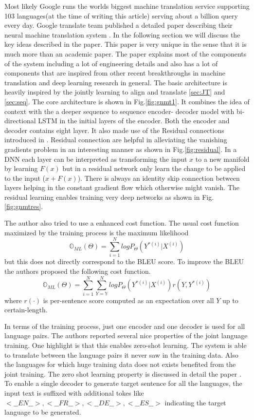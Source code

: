 \documentclass[a4paper]{article}
\begin{document}
Most  likely  Google  runs  the  worlds   biggest  machine  translation  service
supporting 103 languages(at the  time of writing  this article) serving  about a
billion  query  every  day.  Google  translate team published  a detailed  paper
describing their neural  machine translation system \cite{wu2016google}. In  the
following section we will discuss  the key  ideas  described in  the paper. This
paper  is very unique in the sense that it is much more than an  academic paper.
The paper explains most  of  the  components  of the system  including a  lot of
engineering details and  also has a  lot  of components that  are inspired  from
other recent breakthroughs in machine translation and deep  learning research in
general. The  basic architecture is heavily inspired  by the jointly learning to
align  and  translate  \ref{sec:JT} and \ref{sec:seq}. The core architecture  is
shown in Fig.\ref{fig:gnmt1}. It combines the  idea of context with the a deeper
sequence to  sequence encoder- decoder  model  with  bi-directional LSTM in  the
initial  layers  of the encoder.  Both  the  encoder and decoder contains  eight
layer.  It   also  made   use  of   the  Residual  connections   introduced   in
\cite{he2016deep}. Residual connection are helpful in alleviating the  vanishing
gradients problem in an interesting manner as  shown  in Fig.\ref{fig:residual}.
In a DNN each layer can  be  interpreted as transforming the input $x$  to a new
manifold  by learning $F(x)$ but in a  residual network only learn the change to
be  applied  to  the  input  ($x  +  F(x)$). There  is always  an  identity skip
connection between layers helping in the constant gradient flow  which otherwise
might vanish. The residual learning enables training very deep networks as shown
in Fig.\ref{fig:gnmtres}.

The author  also tried to use a  enhanced cost function. The usual cost function
maximized    by    the   training    process   is    the    maximum   likelihood
$$\mathbb{O}_{ML}(\Theta) = \sum_{i=1}^N log P_\Theta(Y^{*(i)} | X^{(i)}) $$ but
this  does  not directly  correspond  to the BLEU score. To improve the BLEU the
authors  proposed  the  following  cost  function. $$  \mathbb{O}_{ML}(\Theta) =
\sum_{i=1}^N  \sum_{Y=\mathbb{Y}}^N   log   P_\Theta(Y^{*(i)}  |  X^{(i)})  r(Y,
Y^{*(i)} ) $$ where $r(\cdot)$ is per-sentence score computed  as an expectation
over all $Y$ up to certain-length.

In terms of the training process, just one encoder and  one  decoder is used for
all  language pairs. The authors reported several nice  properties  of the joint
language training. One highlight is  that this  enables zero-shot  learning. The
system  is able to  translate  between  the language pairs it never  saw in  the
training  data. Also the languages for which  huge training data does not exists
benefited from the joint training.  The zero shot learning property is discussed
in detail the  paper \cite{johnson2016google}.  To  enable  a single  decoder to
generate target sentence for all the languages,  the input text is suffixed with
additional tokes like $<\_\_EN\_\_>,  <\_\_FR\_\_>,  <\_\_DE\_\_>, <\_\_ES\_\_>$
indicating the target language to be generated.
\end{document}
